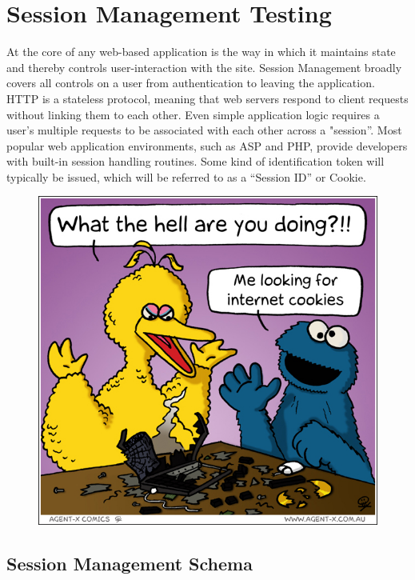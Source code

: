 \chapter{Session Management Testing}

	At the core of any web-based application is the way in which it maintains state and thereby 
	controls user-interaction with the site. Session Management broadly covers all controls on 
	a user from  authentication to leaving the application. HTTP is a stateless protocol, meaning 
	that web servers respond to client requests without linking them to each other. Even simple
	application logic requires a user's multiple requests to be associated with each other across 
	a "session”. Most popular web application environments, such as ASP and PHP, provide developers 
	with built-in session handling routines. Some kind of identification token will typically be issued, 
	which will be referred to as a “Session ID” or Cookie.

	\begin{figure}[H]
		\includegraphics[scale=0.4]{pics/cookie.jpg}
	\end{figure}

	\clearpage
	\section{Session Management Schema}


